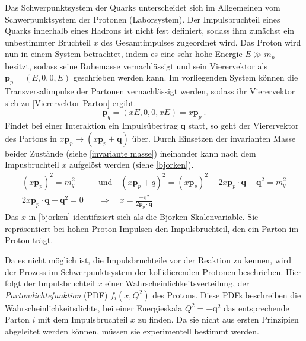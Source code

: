 Das Schwerpunktsystem der Quarks unterscheidet sich im Allgemeinen vom Schwerpunktsystem der Protonen (Laborsystem). Der Impulsbruchteil eines Quarks innerhalb eines Hadrons ist nicht fest definiert, sodass ihm zunächst ein unbestimmter Bruchteil $x$ des Gesamtimpulses zugeordnet wird. Das Proton wird nun in einem System betrachtet, indem es eine sehr hohe Energie  $E \gg m_p$ besitzt, sodass seine Ruhemasse vernachlässigt und sein Vierervektor als $\textbf{p}_p = (E, 0, 0, E)$ geschrieben werden kann. Im vorliegenden System können die Transversalimpulse der Partonen vernachlässigt werden, sodass ihr Vierervektor sich zu \textsf{\autoref{Vierervektor-Parton}} ergibt.
\begin{equation}
\label{Vierervektor-Parton}
\textbf{p}_q = (x E, 0, 0, x E) = x \textbf{p}_p ~.
\end{equation}
Findet bei einer Interaktion ein Impulsübertrag $\textbf{q}$ statt, so geht der Vierervektor des Partons in $x \textbf{p}_p \rightarrow (x \textbf{p}_p + \textbf{q})$ über. Durch Einsetzen der invarianten Masse beider Zustände (siehe \textsf{\autoref{invariante masse}}) ineinander kann nach dem Impusbruchteil $x$ aufgelöst werden (siehe \textsf{\autoref{bjorken}}).
\begin{align}
\left(x \textbf{p}_p\right)^2 = m_q^2 \quad &\text{und} \quad \left(x \textbf{p}_p + q\right)^2 = \left(x \textbf{p}_p\right)^2 + 2x \textbf{p}_p \cdot \textbf{q} + \textbf{q}^2 = m_q^2
\label{invariante masse} \\
2x \textbf{p}_p \cdot \textbf{q} + \textbf{q}^2 = 0 \quad &\Rightarrow \quad x = \frac{-\textbf{q}^2}{2\textbf{p}_p\cdot \textbf{q}}
\label{bjorken}
\end{align}
Das $x$ in \textsf{\autoref{bjorken}} identifiziert sich als die Bjorken-Skalenvariable. Sie repräsentiert bei hohen Proton-Impulsen den Impulsbruchteil, den ein Parton im Proton trägt. 

Da es nicht möglich ist, die Impulsbruchteile vor der Reaktion zu kennen, wird der Prozess im Schwerpunktsystem der kollidierenden Protonen beschrieben. Hier folgt der Impulsbruchteil $x$ einer Wahrscheinlichkeitsverteilung, der \textit{Partondichtefunktion} (PDF) $f_{i}(x, Q^2)$ des Protons. Diese PDFs beschreiben die Wahrscheinlichkeitsdichte, bei einer Energieskala $Q^2 = -\textbf{q}^2$ das entsprechende Parton $i$ mit dem Impulsbruchteil $x$ zu finden. Da sie nicht aus ersten Prinzipien abgeleitet werden können, müssen sie experimentell bestimmt werden. 

